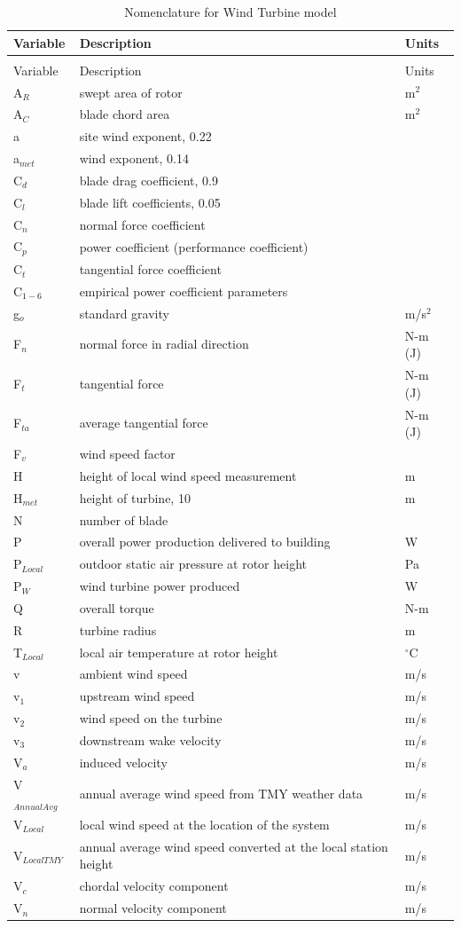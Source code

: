 \begin{longtable}[c]{p{1.2in}p{3.3in}p{1.5in}}
\caption{Nomenclature for Wind Turbine model \label{table:nomenclature-for-wind-turbine-model}} \tabularnewline
\toprule 
Variable & Description & Units \tabularnewline
\midrule
\endfirsthead

\caption[]{Nomenclature for Wind Turbine model} \tabularnewline
\toprule 
Variable & Description & Units \tabularnewline
\midrule
\endhead

A\(_{R}\) & swept area of rotor & m\(^{2}\) \tabularnewline
A\(_{C}\) & blade chord area & m\(^{2}\) \tabularnewline
a & site wind exponent, 0.22 & ~ \tabularnewline
a\(_{met}\) & wind exponent, 0.14 & ~ \tabularnewline
C\(_{d}\) & blade drag coefficient, 0.9 & ~ \tabularnewline
C\(_{l}\) & blade lift coefficients, 0.05 & ~ \tabularnewline
C\(_{n}\) & normal force coefficient & ~ \tabularnewline
C\(_{p}\) & power coefficient (performance coefficient) & ~ \tabularnewline
C\(_{t}\) & tangential force coefficient & ~ \tabularnewline
C\(_{1-6}\) & empirical power coefficient parameters & ~ \tabularnewline
g\(_{o}\) & standard gravity & m/s\(^{2}\) \tabularnewline
F\(_{n}\) & normal force in radial direction & N-m (J) \tabularnewline
F\(_{t}\) & tangential force & N-m (J) \tabularnewline
F\(_{ta}\) & average tangential force & N-m (J) \tabularnewline
F\(_{v}\) & wind speed factor & ~ \tabularnewline
H & height of local wind speed measurement & m \tabularnewline
H\(_{met}\) & height of turbine, 10 & m \tabularnewline
N & number of blade & ~ \tabularnewline
P & overall power production delivered to building~ & W \tabularnewline
P\(_{Local}\) & outdoor static air pressure at rotor height & Pa \tabularnewline
P\(_{W}\) & wind turbine power produced & W \tabularnewline
Q & overall torque & N-m \tabularnewline
R & turbine radius & m \tabularnewline
T\(_{Local}\) & local air temperature at rotor height & \(^{\circ}\)C \tabularnewline
v & ambient wind speed & m/s \tabularnewline
v\(_{1}\) & upstream wind speed & m/s \tabularnewline
v\(_{2}\) & wind speed on the turbine & m/s \tabularnewline
v\(_{3}\) & downstream wake velocity & m/s \tabularnewline
V\(_{a}\) & induced velocity & m/s \tabularnewline
V\(_{AnnualAvg}\) & annual average wind speed from TMY weather data & m/s \tabularnewline
V\(_{Local}\) & local wind speed at the location of the system & m/s \tabularnewline
V\(_{LocalTMY}\) & annual average wind speed converted at the local station height & m/s \tabularnewline
V\(_{c}\) & chordal velocity component & m/s \tabularnewline
V\(_{n}\) & normal velocity component & m/s \tabularnewline

\end{longtable}
